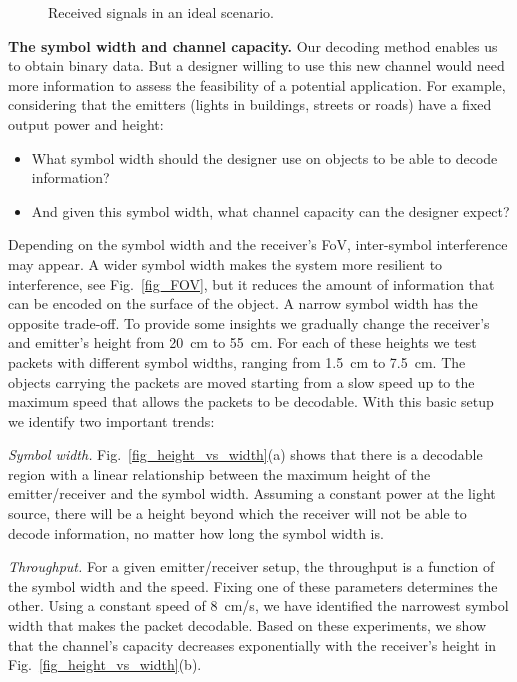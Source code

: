 \documentclass[10pt]{sig-alternate-05-2015}
\begin{document}
\begin{figure}[t]
	\hfill {}
	\vspace{-2mm}
	\caption {Received signals in an ideal scenario.} 
	\vspace{-3mm}
	\label{fig_two_ids}
\end{figure}

{\bf The symbol width and channel capacity.} Our decoding method enables us to obtain binary data. But a designer willing to use this new channel would need more information to assess the feasibility of a potential application. For example, considering that the emitters (lights in buildings, streets or roads) have a fixed output power and height:
\begin{itemize}
	\item What symbol width should the designer use on objects to be able to decode information? 
	\item And given this symbol width, what channel capacity can the designer expect? 
\end{itemize}
Depending on the symbol width and the receiver's FoV, inter-symbol interference may appear. A wider symbol width makes the system more resilient to interference, see Fig.~\ref{fig_FOV}, but it reduces the amount of information that can be encoded on the surface of the object. A narrow symbol width has the opposite trade-off. To provide some insights we gradually change the receiver's and emitter's height from 20~cm to 55~cm. For each of these heights we test packets with different symbol widths, ranging from 1.5~cm to 7.5~cm. The {objects carrying the} packets are moved starting from a slow speed up to the maximum speed that allows the packets to be decodable. With this basic setup we identify two important trends:

\emph{Symbol width.} Fig.~\ref{fig_height_vs_width}(a) shows that there is a decodable region with a linear relationship between the maximum height of the emitter/receiver and the symbol width. Assuming a constant power at the light source, there will be a height beyond which the receiver will not be able to decode information, no matter how long the symbol width is. 

\emph{Throughput.} For a given emitter/receiver setup, the throughput is a function of the symbol width and the speed. Fixing one of these parameters determines the other. Using a constant speed of 8~cm/s, we have identified the narrowest symbol width that makes the packet decodable. Based on these experiments, we show that the channel's capacity decreases exponentially with the receiver's height in Fig.~\ref{fig_height_vs_width}(b). 
\end{document}
